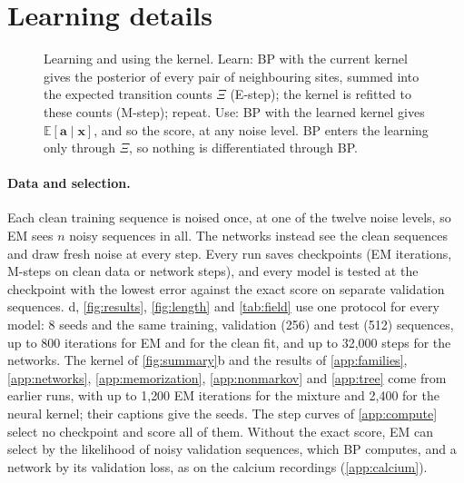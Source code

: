 \documentclass{article}
\begin{document}
\section{Learning details}
\label{app:em}

\begin{figure}[!htbp]
  \centering
  
  \caption{Learning and using the kernel. Learn: BP with the current kernel gives the posterior of every pair of
  neighbouring sites, summed into the expected transition counts $\Xi$ (E-step); the kernel is refitted to these
  counts (M-step); repeat. Use: BP with the learned kernel gives $\mathbb E[\mathbf a\mid\mathbf x]$, and so the score,
  at any noise level. BP enters the learning only through $\Xi$, so nothing is differentiated through BP.}
  \label{fig:em-loop}
\end{figure}

\paragraph{Data and selection.} Each clean training sequence is noised once, at one of the twelve noise levels, so EM
sees $n$ noisy sequences in all. The networks instead see the clean sequences and draw fresh noise at every step. Every
run saves checkpoints (EM iterations, M-steps on clean data or network steps), and every model is tested at the
checkpoint with the lowest error against the exact score on separate validation sequences. d,
\cref{fig:results}, \cref{fig:length} and \cref{tab:field} use one protocol for every model: 8 seeds and the same
training, validation (256) and test (512) sequences, up to 800 iterations for EM and for the clean fit, and up to
32{,}000 steps for the networks. The kernel of \cref{fig:summary}b and the results of \cref{app:families},
\cref{app:networks}, \cref{app:memorization}, \cref{app:nonmarkov} and \cref{app:tree} come from earlier runs, with up
to 1{,}200 EM iterations for the mixture and 2{,}400 for the neural kernel; their captions give the seeds. The step
curves of \cref{app:compute} select no checkpoint and score all of them. Without the exact score, EM can select by the
likelihood of noisy validation sequences, which BP computes, and a network by its validation loss, as on the calcium
recordings (\cref{app:calcium}).
\end{document}
